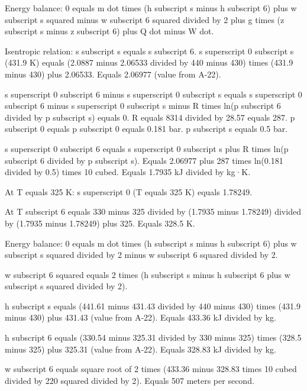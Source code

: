 Energy balance:  
0 equals m dot times (h subscript s minus h subscript 6) plus w subscript s squared minus w subscript 6 squared divided by 2 plus g times (z subscript s minus z subscript 6) plus Q dot minus W dot.  

Isentropic relation:  
s subscript s equals s subscript 6.  
s superscript 0 subscript s (431.9 K) equals (2.0887 minus 2.06533 divided by 440 minus 430) times (431.9 minus 430) plus 2.06533.  
Equals 2.06977 (value from A-22).  

s superscript 0 subscript 6 minus s superscript 0 subscript s equals s superscript 0 subscript 6 minus s superscript 0 subscript s minus R times ln(p subscript 6 divided by p subscript s) equals 0.  
R equals 8314 divided by 28.57 equals 287.  
p subscript 0 equals p subscript 0 equals 0.181 bar.  
p subscript s equals 0.5 bar.  

s superscript 0 subscript 6 equals s superscript 0 subscript s plus R times ln(p subscript 6 divided by p subscript s).  
Equals 2.06977 plus 287 times ln(0.181 divided by 0.5) times 10 cubed.  
Equals 1.7935 kJ divided by kg·K.  

At T equals 325 K:  
s superscript 0 (T equals 325 K) equals 1.78249.  

At T subscript 6 equals 330 minus 325 divided by (1.7935 minus 1.78249) divided by (1.7935 minus 1.78249) plus 325.  
Equals 328.5 K.  

Energy balance:  
0 equals m dot times (h subscript s minus h subscript 6) plus w subscript s squared divided by 2 minus w subscript 6 squared divided by 2.  

w subscript 6 squared equals 2 times (h subscript s minus h subscript 6 plus w subscript s squared divided by 2).  

h subscript s equals (441.61 minus 431.43 divided by 440 minus 430) times (431.9 minus 430) plus 431.43 (value from A-22).  
Equals 433.36 kJ divided by kg.  

h subscript 6 equals (330.54 minus 325.31 divided by 330 minus 325) times (328.5 minus 325) plus 325.31 (value from A-22).  
Equals 328.83 kJ divided by kg.  

w subscript 6 equals square root of 2 times (433.36 minus 328.83 times 10 cubed divided by 220 squared divided by 2).  
Equals 507 meters per second.